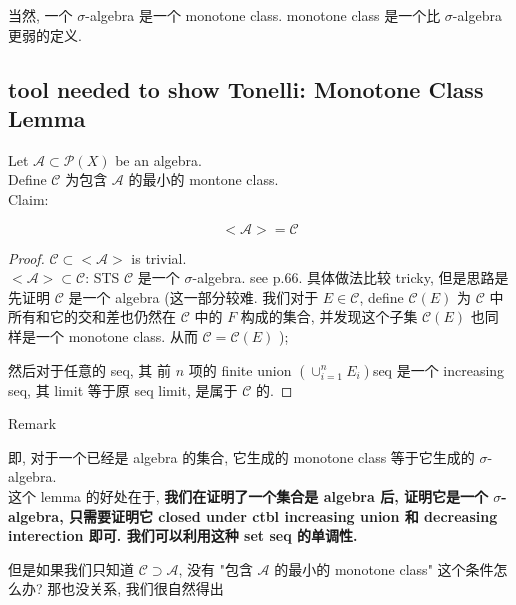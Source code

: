 当然, 一个 \(\sigma\)-algebra 是一个 monotone class. monotone class 是一个比 \(\sigma\)-algebra 更弱的定义.

\subsection{tool needed to show Tonelli: Monotone Class Lemma}\label{tool-needed-to-show-tonelli-monotone-class-lemma}

\begin{lemma}{}

Let \(\mathcal{A} \subset \mathcal{P}(X)\) be an algebra.\\
Define \(\mathcal{C}\) 为包含 \(\mathcal{A}\) 的最小的 montone class.\\
Claim:

\[< \mathcal{A} > = \mathcal{C}\]

\end{lemma}

\begin{proof}

\(\mathcal{C} \subset < \mathcal{A} >\) is trivial.\\
\(< \mathcal{A} > \subset \mathcal{C}\): STS \(\mathcal{C}\) 是一个 \(\sigma\)-algebra. see p.66. 具体做法比较 tricky, 但是思路是先证明 \(\mathcal{C}\) 是一个 algebra (这一部分较难. 我们对于 \(E \in \mathcal{C}\), define \(\mathcal{C}(E)\) 为 \(\mathcal{C}\) 中所有和它的交和差也仍然在 \(\mathcal{C}\) 中的 \(F\) 构成的集合, 并发现这个子集 \(\mathcal{C}(E)\) 也同样是一个 monotone class. 从而 \(\mathcal{C} = \mathcal{C}(E)\) );

然后对于任意的 seq, 其 前 \(n\) 项的 finite union \(( \cup_{i = 1}^{n}E_{i})\)seq 是一个 increasing seq, 其 limit 等于原 seq limit, 是属于 \(\mathcal{C}\) 的.

\end{proof}

\begin{qlremark}{Remark}

即, 对于一个已经是 algebra 的集合, 它生成的 monotone class 等于它生成的 \(\sigma\)-algebra.\\
这个 lemma 的好处在于, \textbf{我们在证明了一个集合是 algebra 后, 证明它是一个 \(\sigma\)-algebra, 只需要证明它 closed under ctbl increasing union 和 decreasing interection 即可. 我们可以利用这种 set seq 的单调性.}

\end{qlremark}

但是如果我们只知道 \(\mathcal{C} \supset \mathcal{A}\), 没有 "包含 \(\mathcal{A}\) 的最小的 monotone class" 这个条件怎么办? 那也没关系, 我们很自然得出

